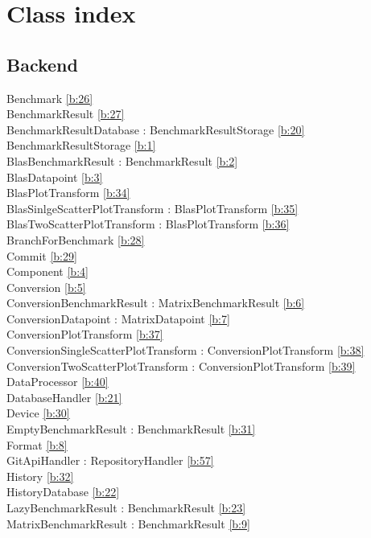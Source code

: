 \section{Class index}

\subsection{Backend}
Benchmark  \ref{b:26}\\
BenchmarkResult  \ref{b:27}\\
BenchmarkResultDatabase : BenchmarkResultStorage  \ref{b:20}\\
BenchmarkResultStorage \ref{b:1} \\
BlasBenchmarkResult : BenchmarkResult \ref{b:2} \\
BlasDatapoint \ref{b:3} \\
BlasPlotTransform  \ref{b:34}\\
BlasSinlgeScatterPlotTransform : BlasPlotTransform  \ref{b:35}\\
BlasTwoScatterPlotTransform : BlasPlotTransform  \ref{b:36}\\
BranchForBenchmark  \ref{b:28}\\
Commit  \ref{b:29}\\
Component \ref{b:4} \\
Conversion \ref{b:5} \\
ConversionBenchmarkResult : MatrixBenchmarkResult \ref{b:6} \\
ConversionDatapoint : MatrixDatapoint  \ref{b:7}\\
ConversionPlotTransform  \ref{b:37}\\
ConversionSingleScatterPlotTransform : ConversionPlotTransform  \ref{b:38}\\
ConversionTwoScatterPlotTransform : ConversionPlotTransform  \ref{b:39}\\
DataProcessor  \ref{b:40}\\
DatabaseHandler  \ref{b:21}\\
Device  \ref{b:30}\\
EmptyBenchmarkResult : BenchmarkResult  \ref{b:31}\\
Format  \ref{b:8}\\
GitApiHandler : RepositoryHandler  \ref{b:57}\\
History  \ref{b:32}\\
HistoryDatabase  \ref{b:22}\\
LazyBenchmarkResult : BenchmarkResult  \ref{b:23}\\
MatrixBenchmarkResult : BenchmarkResult  \ref{b:9}\\
